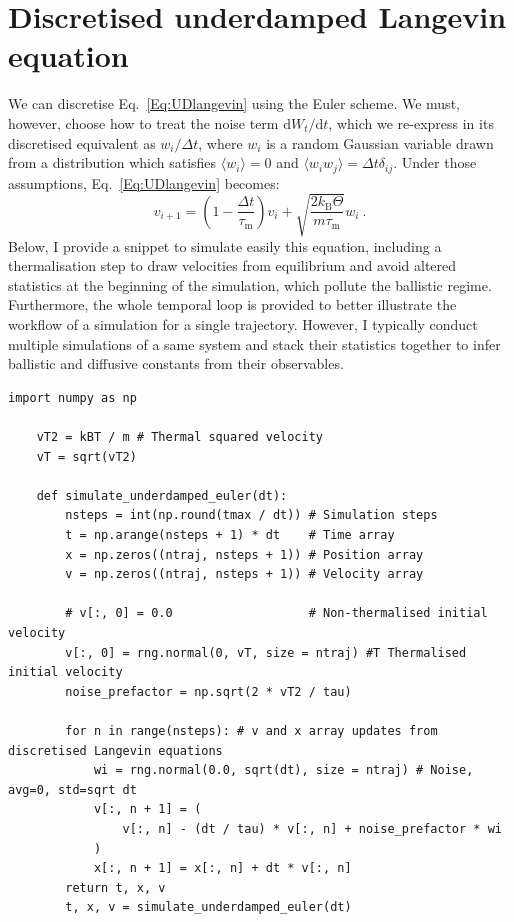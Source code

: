 \section{Discretised underdamped Langevin equation}
We can discretise Eq.~\ref{Eq:UDlangevin} using the Euler scheme. We must, however, choose how to treat the noise term $\mathrm{d}W_t/\mathrm{d}t$, which we re-express in its discretised equivalent as $w_i/\Delta t$, where $w_i$ is a random Gaussian variable drawn from a distribution which satisfies $\langle w_i \rangle = 0$ and $\langle w_i w_j \rangle = \Delta t \delta_{ij}$. Under those assumptions, Eq.~\ref{Eq:UDlangevin} becomes:
\begin{equation}
    v_{i+1} = \left(1 - \dfrac{\Delta t}{\tau_\mathrm{m}}\right)v_i + \sqrt{\dfrac{2k_\mathrm{B}\Theta}{m \tau_\mathrm{m}}} w_i~.
    \label{UDLangevinEuler}
\end{equation}
Below, I provide a snippet to simulate easily this equation, including a thermalisation step to draw velocities from equilibrium and avoid altered statistics at the beginning of the simulation, which pollute the ballistic regime. Furthermore, the whole temporal loop is provided to better illustrate the workflow of a simulation for a single trajectory. However, I typically conduct multiple simulations of a same system and stack their statistics together to infer ballistic and diffusive constants from their observables.
\begin{lstlisting}[caption={Simulation of an underdamped, free bulk Brownian motion}]
    import numpy as np

    vT2 = kBT / m # Thermal squared velocity
    vT = sqrt(vT2)

    def simulate_underdamped_euler(dt):
        nsteps = int(np.round(tmax / dt)) # Simulation steps
        t = np.arange(nsteps + 1) * dt    # Time array
        x = np.zeros((ntraj, nsteps + 1)) # Position array
        v = np.zeros((ntraj, nsteps + 1)) # Velocity array

        # v[:, 0] = 0.0                   # Non-thermalised initial velocity
        v[:, 0] = rng.normal(0, vT, size = ntraj) #T Thermalised initial velocity
        noise_prefactor = np.sqrt(2 * vT2 / tau)

        for n in range(nsteps): # v and x array updates from discretised Langevin equations
            wi = rng.normal(0.0, sqrt(dt), size = ntraj) # Noise, avg=0, std=sqrt dt
            v[:, n + 1] = (
                v[:, n] - (dt / tau) * v[:, n] + noise_prefactor * wi
            )
            x[:, n + 1] = x[:, n] + dt * v[:, n]
        return t, x, v
        t, x, v = simulate_underdamped_euler(dt)
\end{lstlisting}
